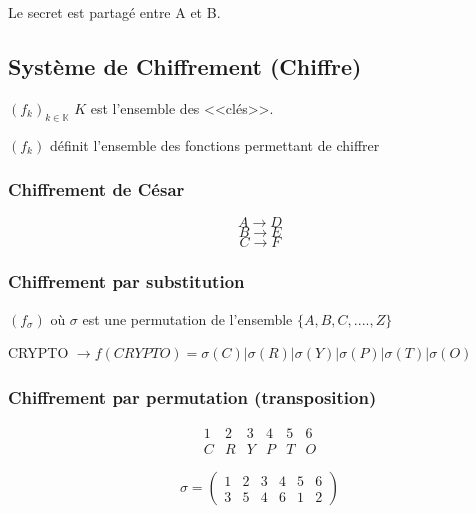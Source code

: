 \documentclass[12pt,a4paper]{article}
\begin{document}
Le secret est partagé entre A et B.

\subsection{Système de Chiffrement (Chiffre)}
$(f_k)_{k \in \mathbb{K}}$  $K$ est l'ensemble des <<clés>>.

$(f_k)$ définit l'ensemble des fonctions permettant de chiffrer

\subsubsection{Chiffrement de César}
\begin{displaymath}
A\longrightarrow D
\end{displaymath}
\begin{displaymath}
B\longrightarrow E
\end{displaymath}
\begin{displaymath}
C\longrightarrow F
\end{displaymath}

\subsubsection{Chiffrement par substitution}

$(f_{\sigma})$ où $\sigma$  est une permutation de l'ensemble $\{A,B,C,....,Z\}$

\bigskip

CRYPTO $\to f(CRYPTO)=\sigma(C)|\sigma(R)|\sigma(Y)|\sigma(P)|\sigma(T)|\sigma(O)$

\subsubsection{Chiffrement par permutation (transposition)}

\begin{displaymath}
\begin{array}{cccccc}
1 & 2 & 3 & 4 & 5 & 6 \\
C & R & Y & P & T & O
\end{array} 
\end{displaymath}

\begin{displaymath}
\sigma = \begin{pmatrix}%
1 & 2 & 3 & 4 & 5 & 6 \\ 
3 & 5 & 4 & 6 & 1 & 2
\end{pmatrix} 
\end{displaymath}
\newline
\end{document}

